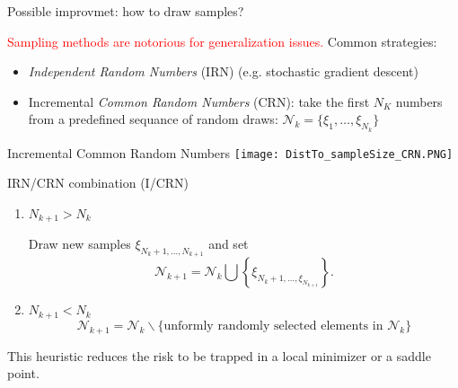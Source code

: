 \documentclass{beamer}
\begin{document}
\begin{frame}{Possible improvmet: how to draw samples?}
	
	\textcolor{red}{Sampling methods are notorious for generalization issues.}
	Common strategies:
	\begin{itemize}
		\item \textit{Independent Random Numbers} (IRN) (e.g. stochastic gradient descent)
		\item Incremental \textit{Common Random Numbers} (CRN): take the first $N_K$ numbers from a predefined sequance of random draws: $\mathcal{N}_k = \{ \xi_1, \ldots, \xi_{N_k} \}$
	\end{itemize}
	
\end{frame}

\begin{frame}{Incremental Common Random Numbers}    
	\centering
	\texttt{[image: DistTo\_sampleSize\_CRN.PNG]}
\end{frame}

\begin{frame}{IRN/CRN combination (I/CRN)}
	
	\begin{enumerate}
		\item $N_{k+1} > N_k$
		
		Draw new samples $\xi_{N_{k}+1,\ldots,N_{k+1}}$ and set
		$$
		\mathcal{N}_{k+1} = \mathcal{N}_k \bigcup \left\{ \xi_{N_{k}+1,\ldots,\xi_{N_{k+1}}} \right\}.
		$$
		
		\item $N_{k+1} < N_k$
		$$\mathcal{N}_{k+1} = \mathcal{N}_k \backslash  \{\text{unformly randomly selected elements in } \mathcal{N}_k\}$$
	\end{enumerate}
	
	This heuristic reduces the risk to be trapped in a local minimizer or a saddle point.
	
\end{frame}
\end{document}
